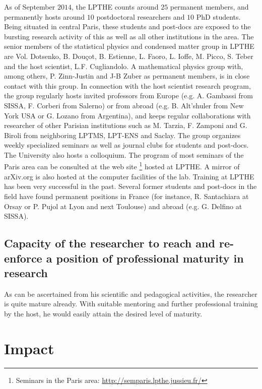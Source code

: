 \documentclass[a4paper,11pt]{article}
\begin{document}
 {
As of September $2014$, the LPTHE counts around $25$ permanent members, and  permanently hosts around $10$ postdoctoral researchers and $10$ PhD students. Being situated in central Paris, these students and post-docs are exposed to the bursting research activity of this as well as all other institutions in the area. The senior members of the statistical physics and condensed matter group in LPTHE are Vol. Dotsenko, B. Dou\c{c}ot, B. Estienne, L. Faoro,  L. Ioffe, M. Picco, S. Teber  and the host scientist, L.F. Cugliandolo. A mathematical physics group with, among others, P. Zinn-Justin and J-B Zuber as permanent members, is in close contact with this group. In connection with the host scientist research program, the group regularly hosts invited professors from Europe (e.g. A. Gambassi from SISSA, F. Corberi from  Salerno) or from abroad (e.g. B. Alt'shuler from New York USA or G. Lozano from Argentina), and keeps regular collaborations with researcher of other Parisian institutions such as M. Tarzia, F. Zamponi and G. Biroli from 
neighboring LPTMS, LPT-ENS and Saclay. The group organizes weekly specialized seminars as well as journal clubs for students and post-docs. The University also hosts a colloquium. The program of most seminars of the Paris area can be consulted at the 
web site \footnote{Seminars in the Paris area: \url{http://semparis.lpthe.jussieu.fr/}} hosted at LPTHE. A mirror of arXiv.org is also hosted at  the computer facilities of the lab. Training at LPTHE has been very successful in the past. Several former students and post-docs in the field have found permanent positions in France (for instance, R. Santachiara at Orsay or P. Pujol at Lyon and next Toulouse) and abroad (e.g. G. Delfino at SISSA).}

\subsection{Capacity of the researcher to reach and re-enforce a
  position of professional maturity in research}
\label{sec:excellence-researcher}
As can be ascertained from his scientific and pedagogical activities, the researcher is quite mature already. With suitable mentoring and further professional training by the host, he would easily attain the desired level of maturity.

\section{Impact}
\end{document}
